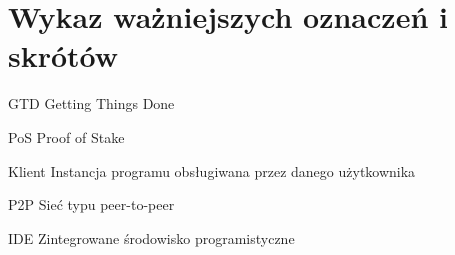 \chapter*{Wykaz ważniejszych oznaczeń i skrótów}

\begin{abbrev}
\item[GTD] Getting Things Done
\item[PoS] Proof of Stake
\item[Klient] Instancja programu obsługiwana przez danego użytkownika
\item[P2P] Sieć typu peer-to-peer
\item[IDE] Zintegrowane środowisko programistyczne
\end{abbrev}

